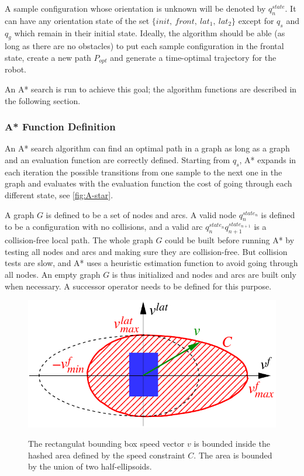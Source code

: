 A sample configuration whose orientation is unknown will be denoted by
$q_n^{state}$. It can have any orientation state of the set
$\{init,~front,~lat_1,~lat_2\}$ except for $q_s$ and $q_g$ which
remain in their initial state.  Ideally, the algorithm should be able
(as long as there are no obstacles) to put each sample configuration
in the frontal state, create a new path $P_{opt}$ and generate a
time-optimal trajectory for the robot.

An A* search is run to achieve this goal; the algorithm functions are
described in the following section.

\subsubsection{A* Function Definition}
\label{sec:A-star}
An A* search algorithm can find an optimal path in a graph
as long as a graph and an evaluation function are correctly
defined. Starting from $q_s$, A* expands in each iteration the
possible transitions from one sample to the next one in the graph and
evaluates with the evaluation function the cost of going through each
different state, see \autoref{fig:A-star}.

A graph $G$ is defined to be a set of nodes and arcs. A valid node
$q_n^{state_n}$ is defined to be a configuration with no collisions, and a valid arc
$q_n^{state_n}q_{n+1}^{state_{n+1}}$ is a collision-free local
path. The whole graph $G$ could be built before running A* by testing
all nodes and arcs and making sure they are collision-free. But
collision tests are slow, and A* uses a heuristic estimation function
to avoid going through all nodes. An empty graph $G$ is thus
initialized and nodes and arcs are built only when necessary. A
successor operator needs to be defined for this purpose.

\begin{figure}
  \centering
      {\includegraphics[width = 0.75\linewidth]
        {src/chap1-path-optimization/elliptic-constraint.pdf}}
      \caption{The rectangulat bounding box speed vector $v$ is bounded inside the
        hashed area defined by the speed constraint $C$. The area is
        bounded by the union of two half-ellipsoids.}
      \label{fig:elliptic-constraint}
\end{figure}

